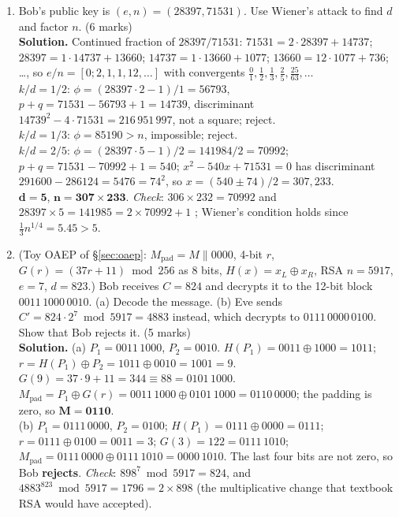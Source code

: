 \begin{enumerate}[leftmargin=1.6em,itemsep=4pt]
  \item Bob's public key is $(e, n) = (28397, 71531)$. Use Wiener's attack to find $d$ and factor $n$. \hfill(6 marks)\\
  \textbf{Solution.} Continued fraction of $28397/71531$: $71531 = 2 \cdot 28397 + 14737$; $28397 = 1 \cdot 14737 + 13660$; $14737 = 1 \cdot 13660 + 1077$; $13660 = 12 \cdot 1077 + 736$; \dots, so $e/n = [0; 2, 1, 1, 12, \dots]$ with convergents $\frac01, \frac12, \frac13, \frac25, \frac{25}{63}, \dots$\\
  $k/d = 1/2$: $\phi = (28397 \cdot 2 - 1)/1 = 56793$, $p + q = 71531 - 56793 + 1 = 14739$, discriminant $14739^2 - 4 \cdot 71531 = 216\,951\,997$, not a square; reject.\\
  $k/d = 1/3$: $\phi = 85190 > n$, impossible; reject.\\
  $k/d = 2/5$: $\phi = (28397 \cdot 5 - 1)/2 = 141984/2 = 70992$; $p + q = 71531 - 70992 + 1 = 540$; $x^2 - 540x + 71531 = 0$ has discriminant $291600 - 286124 = 5476 = 74^2$, so $x = (540 \pm 74)/2 = 307, 233$.\\
  $\mathbf{d = 5}$, $\mathbf{n = 307 \times 233}$. \emph{Check}: $306 \times 232 = 70992$ and $28397 \times 5 = 141985 = 2 \times 70992 + 1$ \checkmark; Wiener's condition holds since $\frac13 n^{1/4} = 5.45 > 5$.

  \item (Toy OAEP of \S\ref{sec:oaep}: $M_{\text{pad}} = M \| 0000$, 4-bit $r$, $G(r) = (37r + 11) \bmod 256$ as 8 bits, $H(x) = x_L \oplus x_R$, RSA $n = 5917$, $e = 7$, $d = 823$.) Bob receives $C = 824$ and decrypts it to the 12-bit block $0011\,1000\,0010$. (a) Decode the message. (b) Eve sends $C' = 824 \cdot 2^7 \bmod 5917 = 4883$ instead, which decrypts to $0111\,0000\,0100$. Show that Bob rejects it. \hfill(5 marks)\\
  \textbf{Solution.} (a) $P_1 = 0011\,1000$, $P_2 = 0010$. $H(P_1) = 0011 \oplus 1000 = 1011$; $r = H(P_1) \oplus P_2 = 1011 \oplus 0010 = 1001 = 9$. $G(9) = 37 \cdot 9 + 11 = 344 \equiv 88 = 0101\,1000$. $M_{\text{pad}} = P_1 \oplus G(r) = 0011\,1000 \oplus 0101\,1000 = 0110\,0000$; the padding is zero, so $\mathbf{M = 0110}$.\\
  (b) $P_1 = 0111\,0000$, $P_2 = 0100$; $H(P_1) = 0111 \oplus 0000 = 0111$; $r = 0111 \oplus 0100 = 0011 = 3$; $G(3) = 122 = 0111\,1010$; $M_{\text{pad}} = 0111\,0000 \oplus 0111\,1010 = 0000\,1010$. The last four bits are not zero, so Bob \textbf{rejects}. \emph{Check}: $898^7 \bmod 5917 = 824$, and $4883^{823} \bmod 5917 = 1796 = 2 \times 898$ (the multiplicative change that textbook RSA would have accepted).


\end{enumerate}
